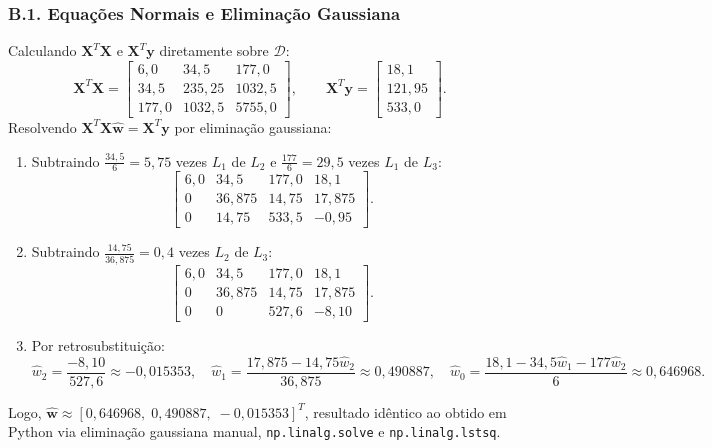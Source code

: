 \documentclass[11pt,a4paper]{article}
\begin{document}
\subsubsection*{B.1. Equações Normais e Eliminação Gaussiana}
Calculando $\mathbf{X}^T\mathbf{X}$ e $\mathbf{X}^T\mathbf{y}$ diretamente sobre $\mathcal{D}$:
\[
\mathbf{X}^T\mathbf{X} = \begin{bmatrix}
6{,}0 & 34{,}5 & 177{,}0 \\
34{,}5 & 235{,}25 & 1032{,}5 \\
177{,}0 & 1032{,}5 & 5755{,}0
\end{bmatrix}, \qquad
\mathbf{X}^T\mathbf{y} = \begin{bmatrix} 18{,}1 \\ 121{,}95 \\ 533{,}0 \end{bmatrix}.
\]
Resolvendo $\mathbf{X}^T\mathbf{X}\hat{\mathbf{w}} = \mathbf{X}^T\mathbf{y}$ por eliminação gaussiana:
\begin{enumerate}
    \item Subtraindo $\frac{34{,}5}{6} = 5{,}75$ vezes $L_1$ de $L_2$ e $\frac{177}{6} = 29{,}5$ vezes $L_1$ de $L_3$:
    \[
    \left[\begin{array}{ccc|c}
    6{,}0 & 34{,}5 & 177{,}0 & 18{,}1 \\
    0 & 36{,}875 & 14{,}75 & 17{,}875 \\
    0 & 14{,}75 & 533{,}5 & -0{,}95
    \end{array}\right].
    \]
    \item Subtraindo $\frac{14{,}75}{36{,}875} = 0{,}4$ vezes $L_2$ de $L_3$:
    \[
    \left[\begin{array}{ccc|c}
    6{,}0 & 34{,}5 & 177{,}0 & 18{,}1 \\
    0 & 36{,}875 & 14{,}75 & 17{,}875 \\
    0 & 0 & 527{,}6 & -8{,}10
    \end{array}\right].
    \]
    \item Por retrosubstituição:
    \[
    \hat{w}_2 = \frac{-8{,}10}{527{,}6} \approx -0{,}015353, \quad
    \hat{w}_1 = \frac{17{,}875 - 14{,}75\hat{w}_2}{36{,}875} \approx 0{,}490887, \quad
    \hat{w}_0 = \frac{18{,}1 - 34{,}5\hat{w}_1 - 177\hat{w}_2}{6} \approx 0{,}646968.
    \]
\end{enumerate}
Logo, $\hat{\mathbf{w}} \approx [0{,}646968,\; 0{,}490887,\; -0{,}015353]^T$, resultado idêntico ao obtido em Python via eliminação gaussiana manual, \texttt{np.linalg.solve} e \texttt{np.linalg.lstsq}.
\end{document}
